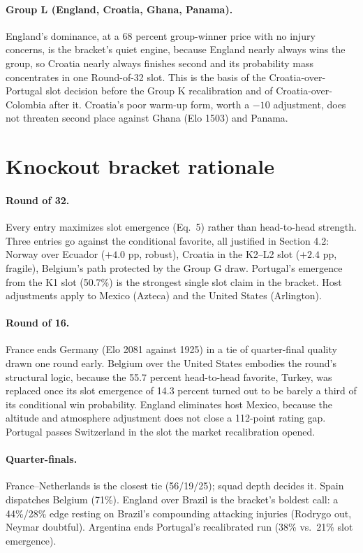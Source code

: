 \documentclass[11pt,a4paper]{article}
\begin{document}
\paragraph{Group L (England, Croatia, Ghana, Panama).} England's dominance, at a 68 percent group-winner price with no injury concerns, is the bracket's quiet engine, because England nearly always wins the group, so Croatia nearly always finishes second and its probability mass concentrates in one Round-of-32 slot. This is the basis of the Croatia-over-Portugal slot decision before the Group K recalibration and of Croatia-over-Colombia after it. Croatia's poor warm-up form, worth a $-10$ adjustment, does not threaten second place against Ghana (Elo 1503) and Panama.

\section{Knockout bracket rationale}\label{app:bracket}

\paragraph{Round of 32.} Every entry maximizes slot emergence (Eq.~5) rather than head-to-head strength. Three entries go against the conditional favorite, all justified in Section 4.2: Norway over Ecuador ($+4.0$ pp, robust), Croatia in the K2--L2 slot ($+2.4$ pp, fragile), Belgium's path protected by the Group G draw. Portugal's emergence from the K1 slot (50.7\%) is the strongest single slot claim in the bracket. Host adjustments apply to Mexico (Azteca) and the United States (Arlington).

\paragraph{Round of 16.} France ends Germany (Elo 2081 against 1925) in a tie of quarter-final quality drawn one round early. Belgium over the United States embodies the round's structural logic, because the 55.7 percent head-to-head favorite, Turkey, was replaced once its slot emergence of 14.3 percent turned out to be barely a third of its conditional win probability. England eliminates host Mexico, because the altitude and atmosphere adjustment does not close a 112-point rating gap. Portugal passes Switzerland in the slot the market recalibration opened.

\paragraph{Quarter-finals.} France--Netherlands is the closest tie (56/19/25); squad depth decides it. Spain dispatches Belgium (71\%). England over Brazil is the bracket's boldest call: a 44\%/28\% edge resting on Brazil's compounding attacking injuries (Rodrygo out, Neymar doubtful). Argentina ends Portugal's recalibrated run (38\% vs.\ 21\% slot emergence).
\end{document}
